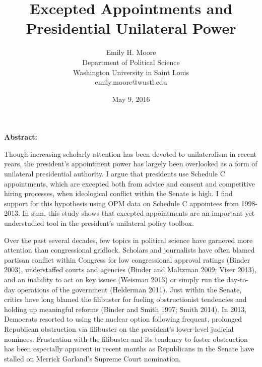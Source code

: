 \documentclass[12pt]{article}
\title{\vspace{2.8in}Excepted Appointments and Presidential Unilateral Power}
\author{Emily H. Moore\\Department of Political Science\\Washington University in Saint Louis\\emily.moore@wustl.edu}
\date{May 9, 2016}
\begin{document}
%
\maketitle
\parindent=0.5in
\parskip=0.01in
\doublespacing

\newpage
\noindent \textbf{Abstract:}

Though increasing scholarly attention has been devoted to unilateralism in recent years, the president's appointment power has largely been overlooked as a form of unilateral presidential authority. I argue that presidents use Schedule C appointments, which are excepted both from advice and consent and competitive hiring processes, when ideological conflict within the Senate is high. I find support for this hypothesis using OPM data on Schedule C appointees from 1998-2013. In sum, this study shows that excepted appointments are an important yet understudied tool in the president's unilateral policy toolbox. 

\newpage
{}

Over the past several decades, few topics in political science have garnered more attention than congressional gridlock. Scholars and journalists have often blamed partisan conflict within Congress for low congressional approval ratings (Binder 2003), understaffed courts and agencies (Binder and Maltzman 2009; Viser 2013), and an inability to act on key issues (Weisman 2013) or simply run the day-to-day operations of the government (Helderman 2011). Just within the Senate, critics have long blamed the filibuster for fueling obstructionist tendencies and holding up meaningful reforms (Binder and Smith 1997; Smith 2014). In 2013, Democrats resorted to using the nuclear option following frequent, prolonged Republican obstruction via filibuster on the president's lower-level judicial nominees. Frustration with the filibuster and its tendency to foster obstruction has been especially apparent in recent months as Republicans in the Senate have stalled on Merrick Garland's Supreme Court nomination.
\end{document}
